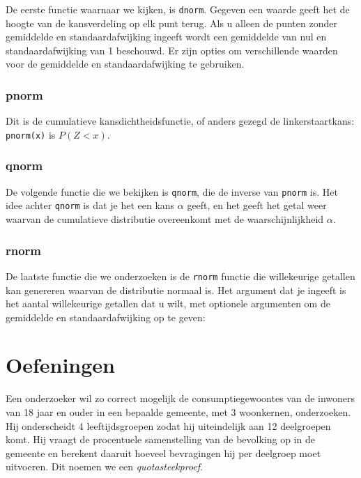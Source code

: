 {De eerste functie waarnaar we kijken, is \texttt{dnorm}. Gegeven een waarde geeft het de hoogte van de kansverdeling op elk punt terug. Als u alleen de punten zonder gemiddelde en standaardafwijking ingeeft wordt een gemiddelde van nul en standaardafwijking van 1 beschouwd. Er zijn opties om verschillende waarden voor de gemiddelde en standaardafwijking te gebruiken.



\subsubsection{pnorm}

Dit is de cumulatieve kansdichtheidsfunctie, of anders gezegd de linkerstaartkans: \texttt{pnorm(x)} is $P(Z < x)$.

\subsubsection{qnorm}
De volgende functie die we bekijken is \texttt{qnorm}, die de inverse van \texttt{pnorm} is. Het idee achter \texttt{qnorm} is dat je het een kans $\alpha$ geeft, en het geeft het getal weer waarvan de cumulatieve distributie overeenkomt met de waarschijnlijkheid $\alpha$.

\subsubsection{rnorm}


De laatste functie die we onderzoeken is de \texttt{rnorm} functie die willekeurige getallen kan genereren waarvan de distributie normaal is. Het argument dat je ingeeft is het aantal willekeurige getallen dat u wilt, met optionele argumenten om de gemiddelde en standaardafwijking op te geven:



\pagebreak
\section{Oefeningen}
\label{sec:steekproefonderzoek-oefeningen}

\begin{exercise}
  Een onderzoeker wil zo correct mogelijk de consumptiegewoontes van de inwoners van 18 jaar en ouder in een bepaalde gemeente, met 3 woonkernen, onderzoeken.  Hij onderscheidt 4 leeftijdsgroepen zodat hij uiteindelijk aan 12 deelgroepen komt. Hij vraagt de procentuele samenstelling van de bevolking op in de gemeente en berekent daaruit hoeveel bevragingen hij per deelgroep moet uitvoeren.  Dit noemen we een \emph{quotasteekproef}.


\end{exercise}}
